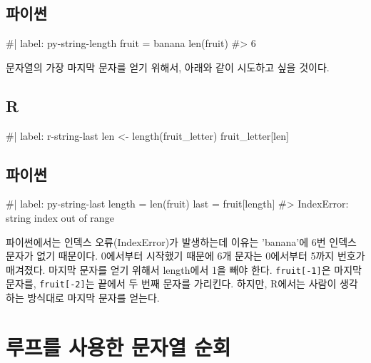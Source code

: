 \documentclass[
  letterpaper,
]{book}
\newenvironment{Shaded}{\begin{snugshade}}{\end{snugshade}}
\newcommand{\NormalTok}[1]{\textcolor[rgb]{0.00,0.23,0.31}{#1}}
\begin{document}
\subsection{파이썬}

\begin{Shaded}
\begin{Highlighting}[]
\NormalTok{\#| label: py{-}string{-}length}
\NormalTok{fruit = \textquotesingle{}banana\textquotesingle{}}
\NormalTok{len(fruit)}
\NormalTok{\#\textgreater{} 6}
\end{Highlighting}
\end{Shaded}

문자열의 가장 마지막 문자를 얻기 위해서, 아래와 같이 시도하고 싶을
것이다.  

\subsection{R}

\begin{Shaded}
\begin{Highlighting}[]
\NormalTok{\#| label: r{-}string{-}last}
\NormalTok{len \textless{}{-} length(fruit\_letter)}
\NormalTok{fruit\_letter[len]}
\end{Highlighting}
\end{Shaded}

\subsection{파이썬}

\begin{Shaded}
\begin{Highlighting}[]
\NormalTok{\#| label: py{-}string{-}last}
\NormalTok{length = len(fruit)}
\NormalTok{last = fruit[length]}
\NormalTok{\#\textgreater{} IndexError: string index out of range}
\end{Highlighting}
\end{Shaded}

파이썬에서는 인덱스 오류(IndexError)가 발생하는데 이유는 'banana'에 6번
인덱스 문자가 없기 때문이다. 0에서부터 시작했기 때문에 6개 문자는
0에서부터 5까지 번호가 매겨졌다. 마지막 문자를 얻기 위해서 length에서
1을 빼야 한다. \texttt{fruit{[}-1{]}}은 마지막 문자를,
\texttt{fruit{[}-2{]}}는 끝에서 두 번째 문자를 가리킨다. 하지만, R에서는
사람이 생각하는 방식대로 마지막 문자를 얻는다. 

\section{루프를 사용한 문자열 순회}\label{r-string-traversal}
\end{document}

